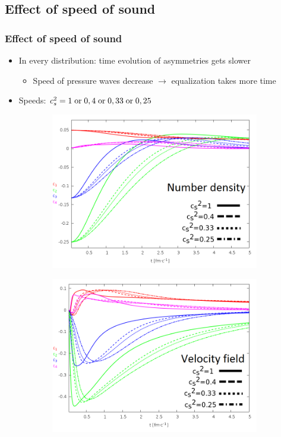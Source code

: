 \documentclass{beamer}
\begin{document}
\subsection{Effect of speed of sound}
\begin{frame}
\frametitle{Effect of speed of sound}
\begin{center}
\begin{itemize}
\setlength{\itemsep}{12pt}
\item<1-> In every distribution: time evolution of asymmetries gets slower
\vspace{8pt}
\begin{itemize}
\item<1-> Speed of pressure waves decrease $\rightarrow$ equalization takes more time
\end{itemize}
\item Speeds: $c_s^2=1\; \rm{or}\;0,4\; \rm{or}\; 0,33\; \rm{or}\; \rm{0,25}$
\end{itemize}
\begin{figure}[H]
	\centering
    \begin{subfigure}[b]{0.49\textwidth}
    		\includegraphics[width=\textwidth]{pic/res/nonrel/eps_cs2_r}
	\end{subfigure}
	\begin{subfigure}[b]{0.49\textwidth}
        	\includegraphics[width=\textwidth]{pic/res/nonrel/eps_cs2_v}

\end{subfigure}
\end{figure}
\end{center}
\end{frame}
\end{document}
